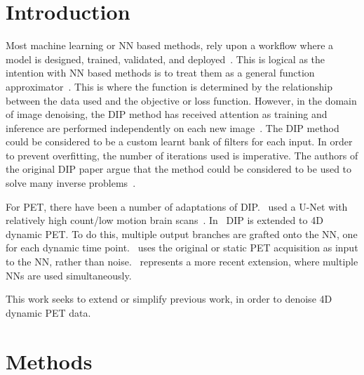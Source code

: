     \section{Introduction} \label{sec:pseudo_bayesian_dip_denoising_as_a_preprocessing_step_for_kinetic_modelling_in_dynamic_pet_appendix_introduction}
        Most machine learning or \gls{NN} based methods, rely upon a workflow where a model is designed, trained, validated, and deployed~\parencite{Krose1993AnNetworks}. This is logical as the intention with \gls{NN} based methods is to treat them as a general function approximator~\parencite{Krose1993AnNetworks}. This is where the function is determined by the relationship between the data used and the objective or loss function. However, in the domain of image denoising, the \gls{DIP} method has received attention as training and inference are performed independently on each new image~\parencite{Ulyanov2020DeepPrior}. The \gls{DIP} method could be considered to be a custom learnt bank of filters for each input. In order to prevent overfitting, the number of iterations used is imperative. The authors of the original \gls{DIP} paper argue that the method could be considered to be used to solve many inverse problems~\parencite{Ulyanov2020DeepPrior}.
        
        For \gls{PET}, there have been a number of adaptations of \gls{DIP}.~\parencite{Gong2019PETPrior} used a U-Net with relatively high count/low motion brain scans~\parencite{Weng2021INet:Segmentation}. In~\parencite{Hashimoto20214DNetwork} \gls{DIP} is extended to \gls{4D} dynamic \gls{PET}. To do this, multiple output branches are grafted onto the \gls{NN}, one for each dynamic time point.~\parencite{Hashimoto2019DynamicDatasets} uses the original or static \gls{PET} acquisition as input to the \gls{NN}, rather than noise.~\parencite{Yang2022SimultaneousPrior} represents a more recent extension, where multiple \glspl{NN} are used simultaneously.
        
        This work seeks to extend or simplify previous work, in order to denoise \gls{4D} dynamic \gls{PET} data.
    \section{Methods}\label{sec:pseudo_bayesian_dip_denoising_as_a_preprocessing_step_for_kinetic_modelling_in_dynamic_pet_appendix_methods}
